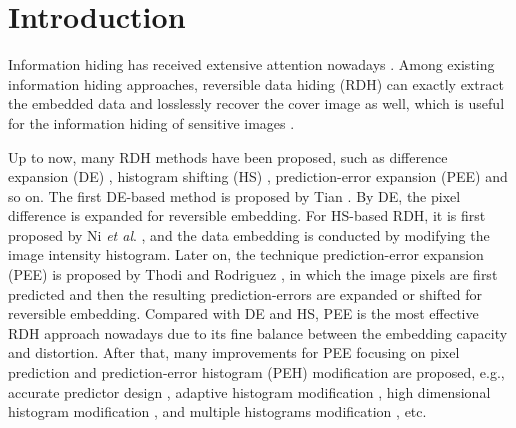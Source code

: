 \documentclass[review,3p,10pt,sort&compress]{elsarticle}
\begin{document}
\section{Introduction}\label{sec:1}

Information hiding has received extensive attention nowadays \cite{IJcox,Fridrich}. Among existing information hiding approaches, reversible data hiding (RDH) can exactly extract the embedded data and losslessly recover the cover image as well, which is useful for the information hiding of sensitive images \cite{shi}.

Up to now, many RDH methods have been proposed, such as difference expansion (DE) \cite{
Tian2003DE,
Qin2013An,
Thodi2007Expansion,
Hu2009DE,
Li2013A},
histogram shifting (HS) \cite{
Hong2009Reversible,
Hong2010A,
Xiaolong2013General,
Wang2018A},
prediction-error expansion (PEE) \cite{
Sachnev2009Reversible,
Tsai2009Reversible,
Gao2011Lossless,
Li2011Efficient,
Hong2011Adaptive,
Wu2012Reversible,
Qin2013An,
Ou2013Pairwise,
Dragoi2014Local,
Li2015Efficient,
Dragoi2016Adaptive,
Wang2017Rate}
and so on. 
The first DE-based method is proposed by Tian \cite{Tian2003DE}. By DE, the pixel difference is expanded for reversible embedding. 
For HS-based RDH, it is first proposed by Ni \emph{et al}. \cite{hs1}, and the data embedding is conducted by modifying the image intensity histogram. 
Later on, the technique prediction-error expansion (PEE) is proposed by Thodi and Rodriguez \cite{Thodi2007Expansion}, in which the image pixels are first predicted and then the resulting prediction-errors are expanded or shifted for reversible embedding. Compared with DE and HS, PEE is the most effective RDH approach nowadays due to its fine balance between the embedding capacity and distortion.
After that, many improvements for PEE focusing on pixel prediction and prediction-error histogram (PEH) modification are proposed, e.g., accurate predictor design \cite{Thodi2007Expansion,Fallahpour2008Reversible,Hu2009DE,Hong2009Reversible,Sachnev2009Reversible,Ioan2014Local,Ioan2015On}, adaptive histogram modification \cite{}, high dimensional histogram modification \cite{Ou2013Pairwise,Li2013A,Dragoi2016Adaptive}, and multiple histograms modification \cite{Li2015Efficient,Xiang2015A,Bo2016Improved}, etc.
\end{document}
